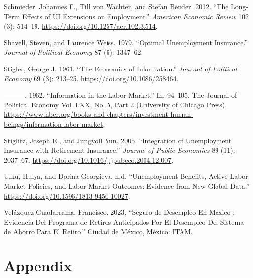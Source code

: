 \documentclass[
  4pt,
]{report}
\newlength{\cslhangindent}
\newenvironment{CSLReferences}[2] %
 {\begin{list}{}{%
  \setlength{\itemindent}{0pt}
  \setlength{\leftmargin}{0pt}
  \setlength{\parsep}{0pt}
  \ifodd #1
   \setlength{\leftmargin}{\cslhangindent}
   \setlength{\itemindent}{-1\cslhangindent}
  \fi
  \setlength{\itemsep}{#2\baselineskip}}}
 {\end{list}}
\begin{document}
\begin{CSLReferences}{1}{0}
Schmieder, Johannes F., Till von Wachter, and Stefan Bender. 2012.
{``The Long-Term Effects of UI Extensions on Employment.''}
\emph{American Economic Review} 102 (3): 514--19.
\url{https://doi.org/10.1257/aer.102.3.514}.

Shavell, Steven, and Laurence Weiss. 1979. {``Optimal Unemployment
Insurance.''} \emph{Journal of Political Economy} 87 (6): 1347--62.

Stigler, George J. 1961. {``The Economics of Information.''}
\emph{Journal of Political Economy} 69 (3): 213--25.
\url{https://doi.org/10.1086/258464}.

---------. 1962. {``Information in the Labor Market.''} In, 94--105. The
Journal of Political Economy Vol. LXX, No. 5, Part 2 (University of
Chicago Press).
\url{https://www.nber.org/books-and-chapters/investment-human-beings/information-labor-market}.

Stiglitz, Joseph E., and Jungyoll Yun. 2005. {``Integration of
Unemployment Insurance with Retirement Insurance.''} \emph{Journal of
Public Economics} 89 (11): 2037--67.
\url{https://doi.org/10.1016/j.jpubeco.2004.12.007}.

Ulku, Hulya, and Dorina Georgieva. n.d. {``Unemployment Benefits, Active
Labor Market Policies, and Labor Market Outcomes: Evidence from New
Global Data.''} \url{https://doi.org/10.1596/1813-9450-10027}.

Velázquez Guadarrama, Francisco. 2023. {``Seguro de Desempleo En México
: Evidencia Del Programa de Retiros Anticipados Por El Desempleo Del
Sistema de Ahorro Para El Retiro.''} Ciudad de México, México: ITAM.

\end{CSLReferences}

\chapter*{Appendix}\label{appendix}

\newpage{}
\end{document}
